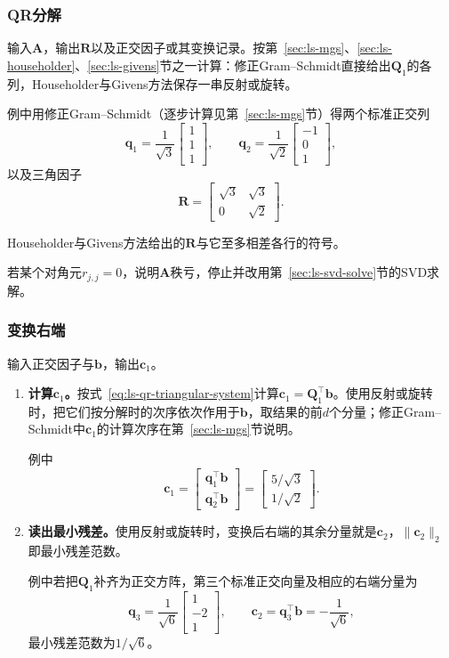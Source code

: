 \subsubsection{QR分解}
输入$\bm A$，输出$\bm R$以及正交因子或其变换记录。按第~\ref{sec:ls-mgs}、\ref{sec:ls-householder}、\ref{sec:ls-givens}节之一计算：修正Gram--Schmidt直接给出$\bm Q_1$的各列，Householder与Givens方法保存一串反射或旋转。

例中用修正Gram--Schmidt（逐步计算见第~\ref{sec:ls-mgs}节）得两个标准正交列
\[
 \bm q_1=\frac1{\sqrt3}\begin{bmatrix}1\\1\\1\end{bmatrix},\qquad
 \bm q_2=\frac1{\sqrt2}\begin{bmatrix}-1\\0\\1\end{bmatrix},
\]
以及三角因子
\[
 \bm R=\begin{bmatrix}\sqrt3&\sqrt3\\0&\sqrt2\end{bmatrix}.
\]

Householder与Givens方法给出的$\bm R$与它至多相差各行的符号。

若某个对角元$r_{j,j}=0$，说明$\bm A$秩亏，停止并改用第~\ref{sec:ls-svd-solve}节的SVD求解。

\subsubsection{变换右端}
输入正交因子与$\bm b$，输出$\bm c_1$。
\begin{enumerate}
 \item \textbf{计算$\bm c_1$。}按式~\eqref{eq:ls-qr-triangular-system}计算$\bm c_1=\bm Q_1^\top\bm b$。使用反射或旋转时，把它们按分解时的次序依次作用于$\bm b$，取结果的前$d$个分量；修正Gram--Schmidt中$\bm c_1$的计算次序在第~\ref{sec:ls-mgs}节说明。
 
 例中
 \[
  \bm c_1=\begin{bmatrix}\bm q_1^\top\bm b\\\bm q_2^\top\bm b\end{bmatrix}
  =\begin{bmatrix}5/\sqrt3\\1/\sqrt2\end{bmatrix}.
 \]

 \item \textbf{读出最小残差。}使用反射或旋转时，变换后右端的其余分量就是$\bm c_2$，$\lVert\bm c_2\rVert_2$即最小残差范数。
 
 例中若把$\bm Q_1$补齐为正交方阵，第三个标准正交向量及相应的右端分量为
 \[
  \bm q_3=\frac1{\sqrt6}\begin{bmatrix}1\\-2\\1\end{bmatrix},\qquad
  \bm c_2=\bm q_3^\top\bm b=-\frac1{\sqrt6},
 \]
 最小残差范数为$1/\sqrt6$。
\end{enumerate}

